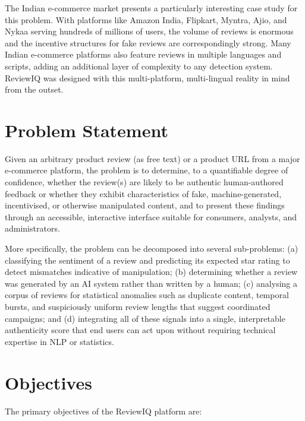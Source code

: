 \documentclass[12pt,a4paper,oneside]{report}
\begin{document}
The Indian e-commerce market presents a particularly interesting case study
for this problem. With platforms like Amazon India, Flipkart, Myntra, Ajio,
and Nykaa serving hundreds of millions of users, the volume of reviews is
enormous and the incentive structures for fake reviews are correspondingly
strong. Many Indian e-commerce platforms also feature reviews in multiple
languages and scripts, adding an additional layer of complexity to any
detection system. ReviewIQ was designed with this multi-platform,
multi-lingual reality in mind from the outset.

\section{Problem Statement}
Given an arbitrary product review (as free text) or a product URL from a
major e-commerce platform, the problem is to determine, to a quantifiable
degree of confidence, whether the review(s) are likely to be authentic
human-authored feedback or whether they exhibit characteristics of fake,
machine-generated, incentivised, or otherwise manipulated content, and to
present these findings through an accessible, interactive interface
suitable for consumers, analysts, and administrators.

More specifically, the problem can be decomposed into several sub-problems:
(a) classifying the sentiment of a review and predicting its expected star
rating to detect mismatches indicative of manipulation; (b) determining
whether a review was generated by an AI system rather than written by a
human; (c) analysing a corpus of reviews for statistical anomalies such as
duplicate content, temporal bursts, and suspiciously uniform review lengths
that suggest coordinated campaigns; and (d) integrating all of these
signals into a single, interpretable authenticity score that end users can
act upon without requiring technical expertise in NLP or statistics.

\section{Objectives}
The primary objectives of the ReviewIQ platform are:
\end{document}
